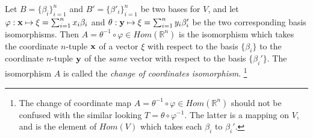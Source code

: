 \documentclass[12pt,letterpaper,reqno]{article}
\numberwithin{equation}{section}
\newcommand{\ti}[1]{\textit{#1}}
\begin{document}
\begin{defn}
	Let $B=\{\beta_i\}_{i=1}^n$ and $B'=\{\beta'_i\}_{i=1}^n$ be two bases for $V$, and let $\varphi:{\bf x} \mapsto \xi=\sum_{i=1}^nx_i\beta_i$ and $\theta:{\bf y} \mapsto \xi=\sum_{i=1}^ny_i\beta_i'$ be the two corresponding basis isomorphisms. Then $A=\theta^{-1} \circ \varphi \in Hom(\mathbb{R}^n)$ is the isomorphism which takes the coordinate $n$-tuple ${\bf x}$ of a vector $\xi$ with respect to the basis $\{\beta_i\}$ to the coordinate $n$-tuple ${\bf y}$ of the \ti{same} vector with respect to the basis $\{\beta_i'\}$. The isomorphism $A$ is called the \ti{change of coordinates isomorphism}.  \footnote{The change of coordinate map $A=\theta^{-1} \circ \varphi \in Hom(\mathbb{R}^n)$ should not be confused with the similar looking $T=\theta \circ \varphi^{-1}$. The latter is a mapping on $V$, and is the element of $Hom(V)$ which takes each $\beta_i$ to $\beta_i'$.}
\end{defn}
\end{document}
